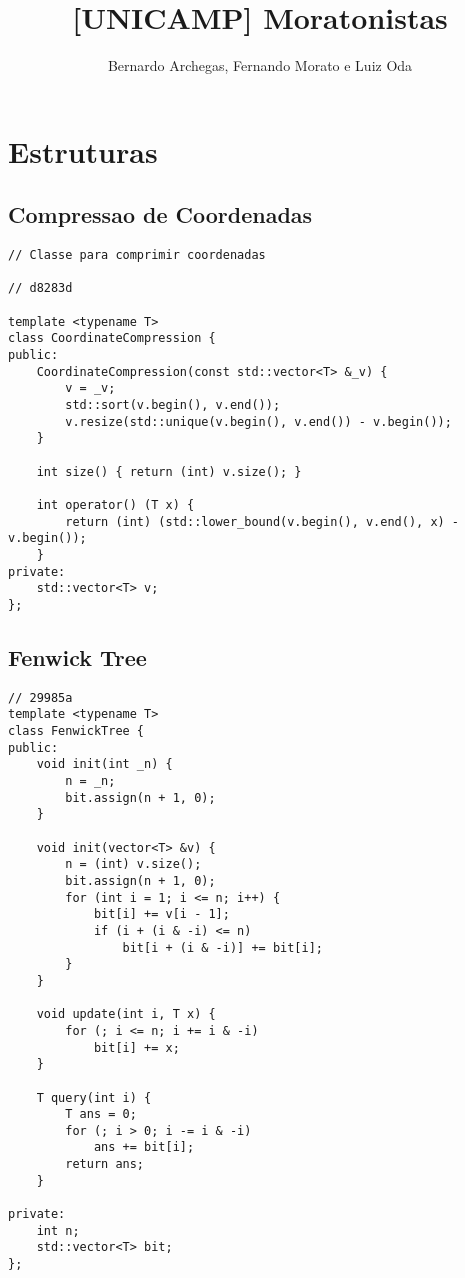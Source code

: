 \documentclass[12pt, a4paper, twoside]{article}
\title{[UNICAMP] Moratonistas}
\author{Bernardo Archegas, Fernando Morato e Luiz Oda}
\begin{document}
\twocolumn
\date{} %
\maketitle


\renewcommand{\contentsname}{Índice} %
\tableofcontents


%
%

\section{Estruturas}

\subsection{Compressao de Coordenadas
}
\begin{lstlisting}
// Classe para comprimir coordenadas

// d8283d

template <typename T>
class CoordinateCompression {
public:
	CoordinateCompression(const std::vector<T> &_v) {
		v = _v;
		std::sort(v.begin(), v.end());
		v.resize(std::unique(v.begin(), v.end()) - v.begin());
	}

	int size() { return (int) v.size(); }

	int operator() (T x) {
		return (int) (std::lower_bound(v.begin(), v.end(), x) - v.begin());
	}
private:
	std::vector<T> v;
};
\end{lstlisting}

\subsection{Fenwick Tree
}
\begin{lstlisting}
// 29985a
template <typename T>
class FenwickTree {
public:
	void init(int _n) {
		n = _n;
		bit.assign(n + 1, 0);
	}

	void init(vector<T> &v) {
		n = (int) v.size();
		bit.assign(n + 1, 0);
		for (int i = 1; i <= n; i++) {
			bit[i] += v[i - 1];
			if (i + (i & -i) <= n)
				bit[i + (i & -i)] += bit[i];
		}
	}

	void update(int i, T x) {
		for (; i <= n; i += i & -i)
			bit[i] += x;
	}

	T query(int i) {
		T ans = 0;
		for (; i > 0; i -= i & -i)
			ans += bit[i];
		return ans;
	}

private:
	int n;
	std::vector<T> bit;
};
\end{lstlisting}
\end{document}
